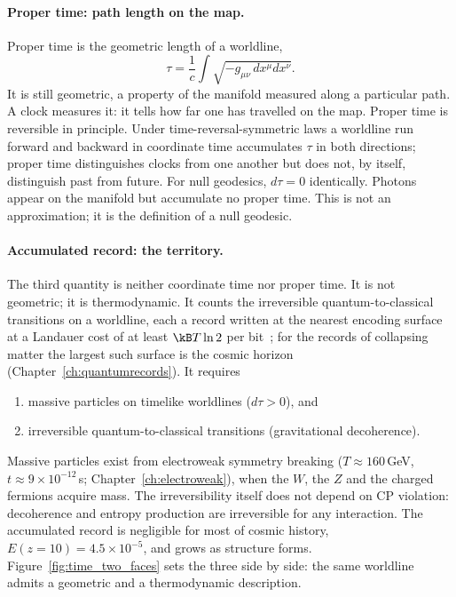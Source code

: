 \paragraph{Proper time: path length on the map.} Proper time is the geometric length of a worldline,
\begin{equation}
\tau=\frac1c\int\sqrt{-g_{\mu\nu}\,dx^\mu dx^\nu}.\label{eq:time_tau}
\end{equation}
It is still geometric, a property of the manifold measured along a particular path. A clock measures it: it tells how far one has travelled on the map.
Proper time is reversible in principle. Under time-reversal-symmetric laws a worldline run forward and backward in coordinate time accumulates $\tau$ in
both directions; proper time distinguishes clocks from one another but does not, by itself, distinguish past from future. For null geodesics,
$d\tau=0$ identically. Photons appear on the manifold but accumulate no proper time. This is not an approximation; it is the definition of a null
geodesic. \derived

\paragraph{Accumulated record: the territory.} The third quantity is neither coordinate time nor proper time. It is not geometric; it is
thermodynamic. It counts the irreversible quantum-to-classical transitions on a worldline, each a record written at the nearest encoding surface at a
Landauer cost of at least $\kB T\ln2$ per bit~\cite{Landauer1961}; for the records of collapsing matter the largest such surface is the cosmic horizon
(Chapter~\ref{ch:quantumrecords}). It requires
\begin{enumerate}
\item massive particles on timelike worldlines ($d\tau>0$), and
\item irreversible quantum-to-classical transitions (gravitational decoherence).
\end{enumerate}
Massive particles exist from electroweak symmetry breaking ($T\approx160$\,GeV, $t\approx9\times10^{-12}$\,s; Chapter~\ref{ch:electroweak}), when the $W$, the
$Z$ and the charged fermions acquire mass. The irreversibility itself does not depend on CP violation: decoherence and entropy production are
irreversible for any interaction. The accumulated record is negligible for most of cosmic history, $E(z{=}10)=4.5\times10^{-5}$, and grows as structure
forms. \calc{} Figure~\ref{fig:time_two_faces} sets the three side by side: the same worldline admits a geometric and a thermodynamic description.

